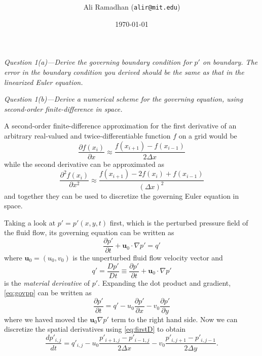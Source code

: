 \documentclass[11pt]{article}
\title{\spacedlowsmallcaps{6.339: Numerical Methods for Partial Differential Equations}\\ \spacedlowsmallcaps{Project one: Finite Difference Methods}}
\author{Ali Ramadhan (\texttt{alir@mit.edu})}
\date{\today}
\begin{document}
\maketitle

\begin{tcolorbox}
  \textit{Question 1(a)---Derive the governing boundary condition for $p'$ on boundary. The error in the boundary condition you derived should be the same as that in the linearized Euler equation.}
\end{tcolorbox}

\begin{tcolorbox}
  \textit{Question 1(b)---Derive a numerical scheme for the governing equation, using second-order finite-difference in space.}
\end{tcolorbox}
A second-order finite-difference approximation for the first derivative of an arbitrary real-valued and twice-differentiable function $f$ on a grid would be 
\begin{equation} \label{eq:firstD}
  \frac{\partial f(x_i)}{\partial x} \approx \frac{f(x_{i+1}) - f(x_{i-1})}{2\Delta x}
\end{equation}
while the second derivative can be approximated as
\begin{equation} \label{eq:secondD}
  \frac{\partial^2 f(x_i)}{\partial x^2} \approx \frac{f(x_{i+1}) - 2f(x_i) + f(x_{i-1})}{(\Delta x)^2}
\end{equation}
and together they can be used to discretize the governing Euler equation in space.

Taking a look at $p' = p'(x,y,t)$ first, which is the perturbed pressure field of the fluid flow, its governing equation can be written as
\begin{equation} \label{eq:govpp}
  \frac{\partial p'}{\partial t} + \mathbf{u}_0 \cdot \nabla p' = q'
\end{equation}
where $\mathbf{u}_0 = (u_0, v_0)$ is the unperturbed fluid flow velocity vector and
\begin{equation*}
  q' = \frac{Dp'}{Dt} \equiv \frac{\partial p'}{\partial t} + \mathbf{u}_0 \cdot \nabla p'
\end{equation*}
is the \emph{material derivative} of $p'$. Expanding the dot product and gradient, \eqref{eq:govpp} can be written as
\begin{equation} \label{eq:govpp}
\frac{\partial p'}{\partial t} = q' - u_0 \frac{\partial p'}{\partial x} - v_0 \frac{\partial p'}{\partial y}
\end{equation}
where we haved moved the $\mathbf{u}_0 \nabla p'$ term to the right hand side. Now we can discretize the spatial derivatives using \eqref{eq:firstD} to obtain
\begin{equation} \label{eq:ppDisc}
  \frac{dp'_{i,j}}{dt} = q'_{i,j} - u_0\frac{p'_{i+1,j} - p'_{i-1,j}}{2\Delta x} - v_0 \frac{p'_{i,j+1} - p'_{i,j-1}}{2\Delta y}.
\end{equation}
\end{document}
